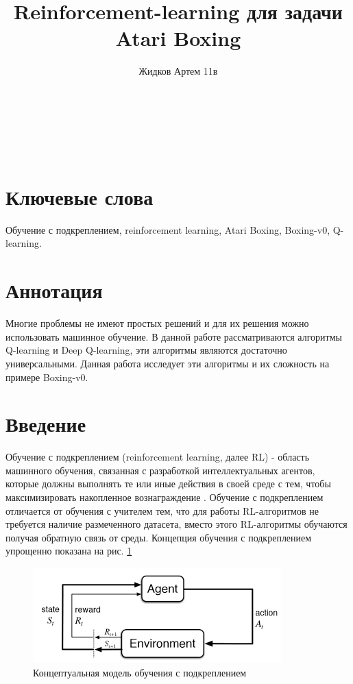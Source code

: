 \documentclass{letask}
\title{Reinforcement-learning для задачи\\ Atari Boxing}
\author{Жидков Артем 11в}
\makeatletter
\def\maketitle{
\begin{center}
\vspace*{\fill}
\huge\textbf{\@title}\\
\vspace*{5mm}
\large{\@author}\\
\large{\@date}\\
\vspace*{\fill}
\end{center}
\newpage}
\makeatother
\begin{document}
\maketitle

\tableofcontents
\newpage

\section*{Ключевые слова}
\normalsize Обучение с подкреплением, reinforcement learning, Atari Boxing, Boxing-v0, Q-learning.

\large

\section{Аннотация}
Многие проблемы не имеют простых решений и для их решения можно использовать машинное обучение. В данной работе рассматриваются алгоритмы Q-learning и Deep Q-learning, эти алгоритмы являются достаточно универсальными. Данная работа исследует эти алгоритмы и их сложность на примере Boxing-v0.
\section{Введение}
Обучение с подкреплением (reinforcement learning, далее RL) - область машинного обучения, связанная с разработкой интеллектуальных агентов, которые должны выполнять те или иные действия в своей среде с тем, чтобы максимизировать накопленное вознаграждение \cite{wikipedia}. Обучение с подкреплением отличается от обучения с учителем тем, что для работы RL-алгоритмов не требуется наличие размеченного датасета, вместо этого RL-алгоритмы обучаются получая обратную связь от среды.
Концепция обучения с подкреплением упрощенно показана на рис. \ref{rl_model}

\begin{figure}[h]
\centering
\includegraphics[scale=0.62]{rl_model.png}
\caption{Концептуальная модель обучения с подкреплением}
\label{rl_model}
\end{figure}
\end{document}
